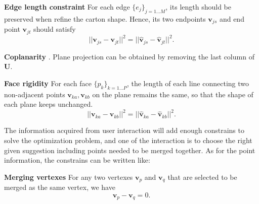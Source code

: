 \noindent
\textbf{Edge length constraint} 
For each edge $\{e_j\}_{j=1...M}$, its length should be preserved when refine the carton shape.
Hence, its two endpoints $\mathbf{v}_{js}$ and end point $\mathbf{v}_{jt}$ should satisfy 
\begin{equation}
||\mathbf{v}_{js} - \mathbf{v}_{jt}||^2 = ||\mathbf{\hat{v}}_{js} - \mathbf{\hat{v}}_{jt}||^2.
\label{equ:edge}
\end{equation}

\noindent
\textbf{Coplanarity} {. Plane projection can be obtained by removing the last column of $\mathbf{U}$. }

\noindent
\textbf{Face rigidity} For each face $\{p_k\}_{k=1 \dots P}$, the length of each line connecting two non-adjacent points $\mathbf{v}_{ka}, \mathbf{v}_{kb}$ on the plane remains the same, so that the shape of each plane keeps unchanged.
\begin{equation}
||\mathbf{v}_{ka} - \mathbf{v}_{kb}||^2 = ||\hat{\mathbf{v}}_{ka} - \hat{\mathbf{v}}_{kb}||^2.
\label{equ:plane}
\end{equation}

The information acquired from user interaction will add enough constrains to solve the optimization problem, and one of the interaction is to choose the right given suggestion including points needed to be merged together. As for the point information, the constrains can be written like:

\noindent
\textbf{Merging vertexes} For any two vertexes $\mathbf{v}_p$ and $\mathbf{v}_q$ that are selected to be merged as the same vertex, we have 
\begin{equation}
\mathbf{v}_p - \mathbf{v}_q = 0.
\label{equ:point}
\end{equation}


